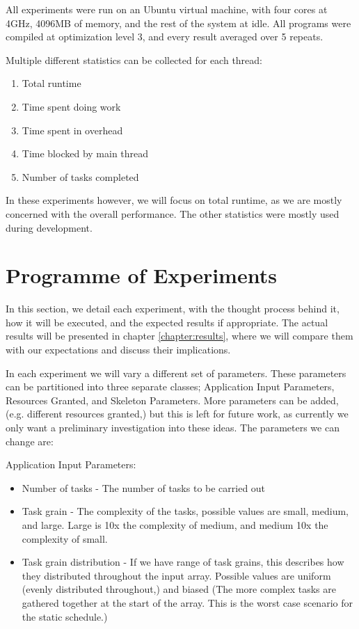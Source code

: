 All experiments were run on an Ubuntu virtual machine, with four cores at 4GHz, 4096MB of memory, and the rest of the system at idle. All programs were compiled at optimization level 3, and every result averaged over 5 repeats.

Multiple different statistics can be collected for each thread:

\begin{enumerate}
	\item Total runtime
	\item Time spent doing work
	\item Time spent in overhead
	\item Time blocked by main thread
	\item Number of tasks completed
\end{enumerate}

In these experiments however, we will focus on total runtime, as we are mostly concerned with the overall performance. The other statistics were mostly used during development.



\section{Programme of Experiments}

In this section, we detail each experiment, with the thought process behind it, how it will be executed, and the expected results if appropriate. The actual results will be presented in chapter \ref{chapter:results}, where we will compare them with our expectations and discuss their implications.

In each experiment we will vary a different set of parameters. These parameters can be partitioned into three separate classes; Application Input Parameters, Resources Granted, and Skeleton Parameters. More parameters can be added, (e.g. different resources granted,) but this is left for future work, as currently we only want a preliminary investigation into these ideas. The parameters we can change are:

Application Input Parameters:

\begin{itemize}
	\item Number of tasks - The number of tasks to be carried out
	\item Task grain - The complexity of the tasks, possible values are small, medium, and large. Large is 10x the complexity of medium, and medium 10x the complexity of small.
	\item Task grain distribution - If we have range of task grains, this describes how they distributed throughout the input array. Possible values are uniform (evenly distributed throughout,) and biased (The more complex tasks are gathered together at the start of the array. This is the worst case scenario for the static schedule.)
\end{itemize}


